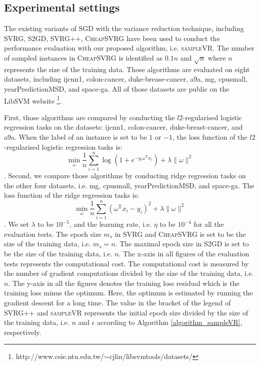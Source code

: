 \documentclass[letterpaper]{article}
\begin{document}
\subsection{Experimental settings}
\label{sect_experimental_settings}
The existing variants of SGD with the variance reduction technique, including SVRG, S2GD, SVRG++, \textsc{CheapSVRG} have been used to conduct the performance evaluation with our proposed algorithm, i.e. \textsc{sampleVR}. The number of sampled instances in \textsc{CheapSVRG} is identified as $0.1n$ and $\sqrt{n}$ where $n$ represents the size of the training data.
Those algorithms are evaluated on eight datasets, including ijcnn1, colon-cancer, duke-brease-cancer, a9a, mg, cpusmall, yearPredictionMSD, and space-ga. All of those datasets are public on the LibSVM website \footnote{http://www.csie.ntu.edu.tw/$\sim$cjlin/libsvmtools/datasets/}. 

First, those algorithms are compared by conducting the $l2$-regularised logistic regression tasks on the datasets: ijcnn1, colon-cancer, duke-breast-cancer, and a9a. When the label of an instance is set to be $1$ or $-1$, the loss function of the $l2$-regularised logistic regression tasks is:
$$
\min\limits_\omega \frac{1}{n}\sum\limits_{i=1}^n \log(1+e^{-y_i \omega^\mathrm{T} x_i }) + \lambda \parallel \omega \parallel^2
$$. Second, we compare those algorithms by conducting ridge regression tasks on the other four datasets, i.e. mg, cpusmall, yearPredictionMSD, and space-ga. The loss function of the ridge regression tasks is:
$$
\min\limits_\omega \frac{1}{n}\sum\limits_{i=1}^n\left(\omega^{\mathrm{T}}x_i-y_i\right)^2 + \lambda \parallel \omega \parallel^2
$$. We set $\lambda$ to be $10^{-5}$, and the learning rate, i.e. $\eta$ to be $10^{-4}$ for all the evaluation tests.  The epoch size $m_s$ in SVRG and \textsc{CheapSVRG} is set to be the size of the training data, i.e. $m_s=n$. The maximal epoch size in S2GD is set to be the size of the training data, i.e. $n$.    The x-axis in all  figures of the evaluation tests represents the computational cost. The computational cost is measured by the number of gradient computations divided by  the size of the training data, i.e. $n$. The y-axis in all the figures denotes the training loss residual which is the training loss minus the optimum. Here, the optimum is estimated by running the gradient descent for a long time. The value in the bracket of the legend of SVRG++ and \textsc{sampleVR} represents the initial epoch size divided by the size of the training data, i.e. $n$ and $\epsilon$ according to Algorithm \ref{algorithm_sampleVR}, respectively.
\end{document}
